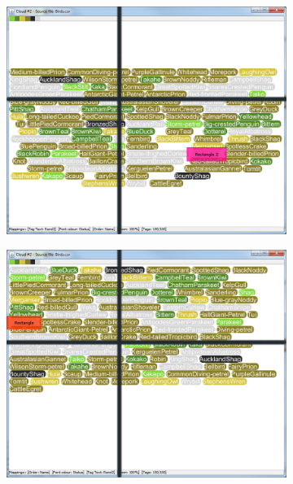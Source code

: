 \begin{figure}[!htb]
\begin{subfigure}{.5\textwidth}
  \includegraphics[scale=0.25]{Experiment2/T2/M2Spiral.png}
\end{subfigure}%
\begin{subfigure}{.5\textwidth}
  \centering
 \includegraphics[scale=0.25]{Experiment2/T2/M2Typewriter.png}
\end{subfigure}
\begin{subfigure}{.5\textwidth}
  \centering

\end{subfigure}
\end{figure}
